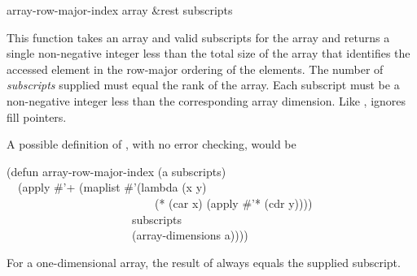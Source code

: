 \begin{defun}[Function]
array-row-major-index array &rest subscripts

This function takes an array and valid subscripts for the array
and returns a single non-negative integer less than the total size
of the array that identifies the
accessed element in the row-major ordering of the elements.
The number of \emph{subscripts} supplied must equal the rank of the array.
Each subscript must be a non-negative integer less than the
corresponding array dimension.
Like ,  ignores fill pointers.

A possible definition of , with no error checking,
would be
\begin{lisp}
(defun array-row-major-index (a  subscripts) \\
~~(apply \#'+ (maplist \#'(lambda (x y) \\
~~~~~~~~~~~~~~~~~~~~~~~~~~(* (car x) (apply \#'* (cdr y)))) \\
~~~~~~~~~~~~~~~~~~~~~~subscripts \\
~~~~~~~~~~~~~~~~~~~~~~(array-dimensions a))))
\end{lisp}
For a one-dimensional array, the result of 
always equals the supplied subscript.
\end{defun}

